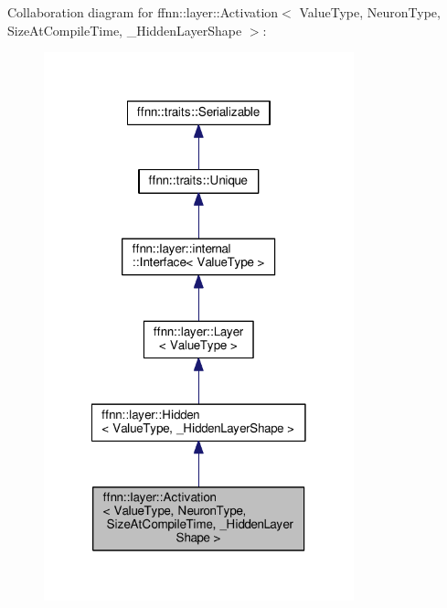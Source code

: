 Collaboration diagram for ffnn\-:\-:layer\-:\-:Activation$<$ Value\-Type, Neuron\-Type, Size\-At\-Compile\-Time, \-\_\-\-Hidden\-Layer\-Shape $>$\-:\nopagebreak
\begin{figure}[H]
\begin{center}
\leavevmode
\includegraphics[width=254pt]{classffnn_1_1layer_1_1_activation__coll__graph}
\end{center}
\end{figure}
